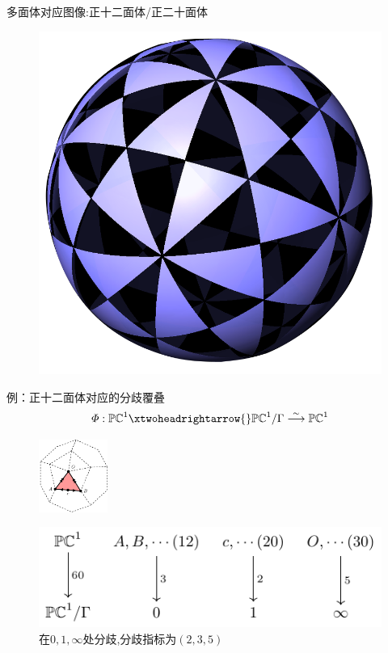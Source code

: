 \documentclass[pdf]{beamer}
\numberwithin{equation}{section}
\theoremstyle{plain}
\theoremstyle{plain}
\theoremstyle{remark}
\begin{document}
\begin{frame}[label=RS]{多面体对应图像:正十二面体/正二十面体}
\begin{figure}[ht]
	\centering
	\includegraphics[width=.45\textwidth]{fromweb/Gamma235.png}
\end{figure}
\hyperlink{flowchart233<9>}{}
\end{frame}
\begin{frame}[label=covering]{例：正十二面体对应的分歧覆叠}
\hspace{-2em}
$$\varPhi:\mathbb{PC}^1\xtwoheadrightarrow{}\mathbb{PC}^1/\Gamma\overset{\sim}{\longrightarrow}\mathbb{PC}^1$$
\begin{figure}[ht]

\begin{minipage}[t]{.34\textwidth}
	\vspace{0.1cm}
	\centering
	\includegraphics[width=2.25cm]{poly/poly4-2.pdf}
	
\end{minipage}
\begin{minipage}[t]{.64\textwidth}
	\vspace{0.1cm}
	\centering
	\includegraphics[scale=0.75]{commu/commu2-00.pdf}\\[0cm]
	在$0,1,\infty$处分歧,分歧指标为$(2,3,5)$
\end{minipage}
\label{pic:comm2}
\end{figure}
\hyperlink{flowchart233<9>}{}
\end{frame}





\renewcommand\refname{{\textbf{参考文献}}}
	

\end{document}
